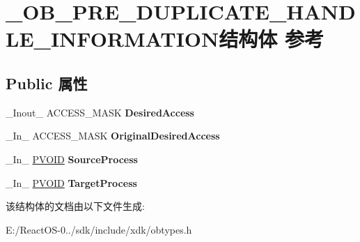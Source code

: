 \hypertarget{struct___o_b___p_r_e___d_u_p_l_i_c_a_t_e___h_a_n_d_l_e___i_n_f_o_r_m_a_t_i_o_n}{}\section{\+\_\+\+O\+B\+\_\+\+P\+R\+E\+\_\+\+D\+U\+P\+L\+I\+C\+A\+T\+E\+\_\+\+H\+A\+N\+D\+L\+E\+\_\+\+I\+N\+F\+O\+R\+M\+A\+T\+I\+O\+N结构体 参考}
\label{struct___o_b___p_r_e___d_u_p_l_i_c_a_t_e___h_a_n_d_l_e___i_n_f_o_r_m_a_t_i_o_n}
\subsection*{Public 属性}
\begin{DoxyCompactItemize}
\item 
\mbox{\label{struct___o_b___p_r_e___d_u_p_l_i_c_a_t_e___h_a_n_d_l_e___i_n_f_o_r_m_a_t_i_o_n_a865b01e86adf8a96660e0e60135c7715}} 
\+\_\+\+Inout\+\_\+ A\+C\+C\+E\+S\+S\+\_\+\+M\+A\+SK {\bfseries Desired\+Access}
\item 
\mbox{\label{struct___o_b___p_r_e___d_u_p_l_i_c_a_t_e___h_a_n_d_l_e___i_n_f_o_r_m_a_t_i_o_n_a0629895bdbf1e3f6285b41031e31d21b}} 
\+\_\+\+In\+\_\+ A\+C\+C\+E\+S\+S\+\_\+\+M\+A\+SK {\bfseries Original\+Desired\+Access}
\item 
\mbox{\label{struct___o_b___p_r_e___d_u_p_l_i_c_a_t_e___h_a_n_d_l_e___i_n_f_o_r_m_a_t_i_o_n_ab4a02eff18479f58f279319e4d91a4e1}} 
\+\_\+\+In\+\_\+ \hyperlink{interfacevoid}{P\+V\+O\+ID} {\bfseries Source\+Process}
\item 
\mbox{\label{struct___o_b___p_r_e___d_u_p_l_i_c_a_t_e___h_a_n_d_l_e___i_n_f_o_r_m_a_t_i_o_n_af3bf3d9b56b98d7e0b318adf4907a058}} 
\+\_\+\+In\+\_\+ \hyperlink{interfacevoid}{P\+V\+O\+ID} {\bfseries Target\+Process}
\end{DoxyCompactItemize}


该结构体的文档由以下文件生成\+:\begin{DoxyCompactItemize}
\item 
E\+:/\+React\+O\+S-\/0../sdk/include/xdk/obtypes.\+h\end{DoxyCompactItemize}
